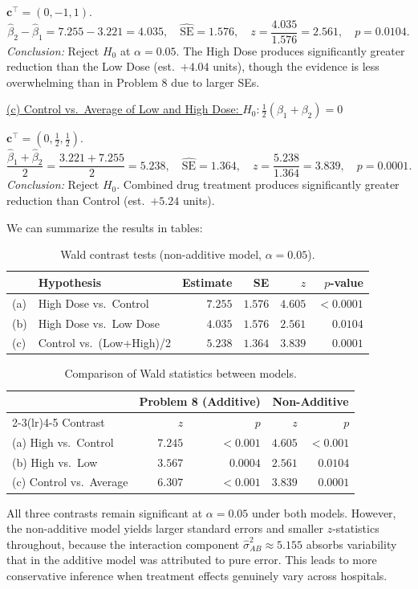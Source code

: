 \documentclass[letterpaper]{article}
\begin{document}
	$\mathbf{c}^\top=(0,-1,1)$.
	\[
	\hat{\beta}_2 - \hat{\beta}_1 = 7.255 - 3.221 = 4.035,\quad
	\widehat{\text{SE}} = 1.576,\quad
	z = \frac{4.035}{1.576} = 2.561,\quad
	p = 0.0104.
	\]
	\textit{Conclusion:} Reject $H_0$ at $\alpha=0.05$. The High Dose produces
	significantly greater reduction than the Low Dose (est.\ $+4.04$ units),
	though the evidence is less overwhelming than in Problem 8 due to larger SEs.
	
	\underline{(c) Control vs.\ Average of Low and High Dose:
		$H_0:\tfrac{1}{2}(\beta_1+\beta_2)=0$}
	
	$\mathbf{c}^\top=(0,\tfrac{1}{2},\tfrac{1}{2})$.
	\[
	\frac{\hat{\beta}_1+\hat{\beta}_2}{2}
	= \frac{3.221+7.255}{2} = 5.238,\quad
	\widehat{\text{SE}} = 1.364,\quad
	z = \frac{5.238}{1.364} = 3.839,\quad
	p = 0.0001.
	\]
	\textit{Conclusion:} Reject $H_0$. Combined drug treatment produces
	significantly greater reduction than Control (est.\ $+5.24$ units).
	
	We can summarize the results in tables:

	\begin{table}[H]
		\centering
		\begin{tabular}{llrrrr}
			\toprule
			& Hypothesis & Estimate & SE & $z$ & $p$-value \\
			\midrule
			(a) & High Dose vs.\ Control      & $7.255$ & $1.576$ & $4.605$ & $<0.0001$ \\
			(b) & High Dose vs.\ Low Dose     & $4.035$ & $1.576$ & $2.561$ & $0.0104$  \\
			(c) & Control vs.\ (Low+High)/2   & $5.238$ & $1.364$ & $3.839$ & $0.0001$  \\
			\bottomrule
		\end{tabular}
		\caption{Wald contrast tests (non-additive model, $\alpha=0.05$).}
	\end{table}

	
	\begin{table}[H]
		\centering
		\begin{tabular}{lrrrr}
			\toprule
			& \multicolumn{2}{c}{Problem 8 (Additive)} & \multicolumn{2}{c}{Non-Additive} \\
			\cmidrule(lr){2-3}\cmidrule(lr){4-5}
			Contrast & $z$ & $p$ & $z$ & $p$ \\
			\midrule
			(a) High vs.\ Control    & $7.245$ & $<0.001$ & $4.605$ & $<0.001$ \\
			(b) High vs.\ Low        & $3.567$ & $0.0004$ & $2.561$ & $0.0104$ \\
			(c) Control vs.\ Average & $6.307$ & $<0.001$ & $3.839$ & $0.0001$ \\
			\bottomrule
		\end{tabular}
		\caption{Comparison of Wald statistics between models.}
	\end{table}
	
	All three contrasts remain significant at $\alpha=0.05$ under both models.
	However, the non-additive model yields {larger standard errors} and
	{smaller $z$-statistics} throughout, because the interaction component
	$\hat{\sigma}^2_{AB}\approx 5.155$ absorbs variability that in the additive
	model was attributed to pure error. This leads to more conservative inference when treatment effects genuinely vary across hospitals.
		
	
\end{document}
